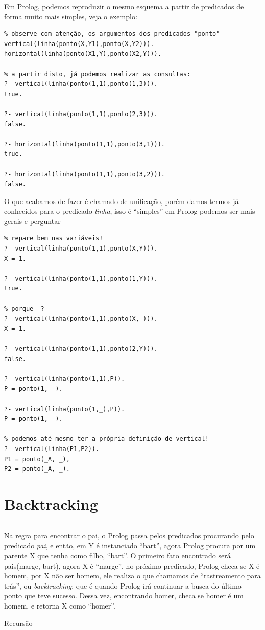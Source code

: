 Em Prolog, podemos reproduzir o mesmo esquema a partir de predicados de forma
muito mais simples, veja o exemplo:

\begin{verbatim}
% observe com atenção, os argumentos dos predicados "ponto"
vertical(linha(ponto(X,Y1),ponto(X,Y2))).
horizontal(linha(ponto(X1,Y),ponto(X2,Y))).

% a partir disto, já podemos realizar as consultas:
?- vertical(linha(ponto(1,1),ponto(1,3))).
true.

?- vertical(linha(ponto(1,1),ponto(2,3))).
false.

?- horizontal(linha(ponto(1,1),ponto(3,1))).
true.

?- horizontal(linha(ponto(1,1),ponto(3,2))).
false.
\end{verbatim}

O que acabamos de fazer é chamado de unificação, porém damos termos já
conhecidos para o predicado \emph{linha}, isso é ``simples'' em Prolog podemos
ser mais gerais e perguntar %

\begin{verbatim}
% repare bem nas variáveis!
?- vertical(linha(ponto(1,1),ponto(X,Y))).
X = 1.

?- vertical(linha(ponto(1,1),ponto(1,Y))).
true.

% porque _?
?- vertical(linha(ponto(1,1),ponto(X,_))).
X = 1.

?- vertical(linha(ponto(1,1),ponto(2,Y))).
false.

?- vertical(linha(ponto(1,1),P)).
P = ponto(1, _).

?- vertical(linha(ponto(1,_),P)).
P = ponto(1, _).

% podemos até mesmo ter a própria definição de vertical!
?- vertical(linha(P1,P2)).
P1 = ponto(_A, _),
P2 = ponto(_A, _).
\end{verbatim}

\newpage
\section{Backtracking}
\inputminted{prolog}{codigo/backtrack_simpson.pl}
Na regra para encontrar o pai, o Prolog passa pelos predicados procurando pelo
predicado \emph{pai}, e então, em Y é instanciado ``bart'', agora Prolog procura
por um parente X que tenha como filho, ``bart''. O primeiro fato encontrado será
pais(marge, bart), agora X é ``marge'', no próximo predicado, Prolog checa se X
é homem, por X não ser homem, ele realiza o que chamamos de ``rastreamento para
trás'', ou \textit{backtracking}; que é quando Prolog irá continuar a busca do
último ponto que teve sucesso. Dessa vez, encontrando homer, checa se homer é um
homem, e retorna X como ``homer''.

Recursão
\inputminted{prolog}{codigo/fatorial.pl}







